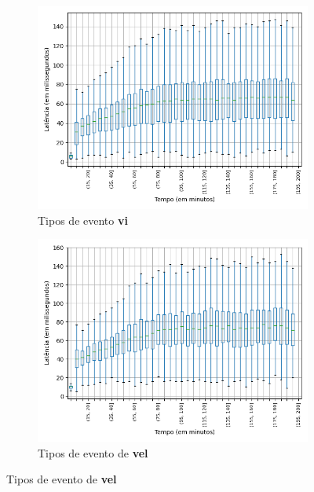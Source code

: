 \begin{figure}
\begin{subfigure}{.5\textwidth}
\centering
\includegraphics[width=\textwidth]{figuras/graphics/boxplot_6-dez-is_vi.png}
\caption{Tipos de evento \textbf{vi}}
\label{fig:BoxPlot_vi_IS_1}
\end{subfigure}%
\centering
\begin{subfigure}{.5\textwidth}
\centering
\includegraphics[width=\textwidth]{figuras/graphics/boxplot_6-dez-is_vel.png}
\caption{Tipos de evento de \textbf{vel}}
\label{fig:BoxPlot_vel_IS_1}
\end{subfigure}%


\end{figure}
